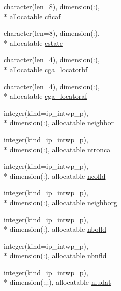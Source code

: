 \begin{DoxyCompactItemize}
\item 
character(len=8), dimension(\+:), \\*
allocatable \hyperlink{classmod__oasis__namcouple_a9b3c7c879a3ff2b5eb15cbcaf5a8a1d9}{cficaf}
\item 
character(len=8), dimension(\+:), \\*
allocatable \hyperlink{classmod__oasis__namcouple_a4b507ab44ad62713c9e3d83ded6be3f4}{cstate}
\item 
character(len=4), dimension(\+:), \\*
allocatable \hyperlink{classmod__oasis__namcouple_ac22155599e9b49d57514dd1f7dc9928a}{cga\+\_\+locatorbf}
\item 
character(len=4), dimension(\+:), \\*
allocatable \hyperlink{classmod__oasis__namcouple_a6f4080d45f0b9be5a0466967f535b83b}{cga\+\_\+locatoraf}
\item 
integer(kind=ip\+\_\+intwp\+\_\+p), \\*
dimension(\+:), allocatable \hyperlink{classmod__oasis__namcouple_a298c9165785ae1a41f89597cadd211e7}{neighbor}
\item 
integer(kind=ip\+\_\+intwp\+\_\+p), \\*
dimension(\+:), allocatable \hyperlink{classmod__oasis__namcouple_aaf9fd5eaa5d115f2548b8f78cdcd172d}{ntronca}
\item 
integer(kind=ip\+\_\+intwp\+\_\+p), \\*
dimension(\+:), allocatable \hyperlink{classmod__oasis__namcouple_a9f8a2a4f44b1c56860fef8df014339d3}{ncofld}
\item 
integer(kind=ip\+\_\+intwp\+\_\+p), \\*
dimension(\+:), allocatable \hyperlink{classmod__oasis__namcouple_a883d88938c50264711c53af2b555c3db}{neighborg}
\item 
integer(kind=ip\+\_\+intwp\+\_\+p), \\*
dimension(\+:), allocatable \hyperlink{classmod__oasis__namcouple_a21400200658d24cbf7484b5eb177c911}{nbofld}
\item 
integer(kind=ip\+\_\+intwp\+\_\+p), \\*
dimension(\+:), allocatable \hyperlink{classmod__oasis__namcouple_af0c7b1e7e49159c6b9c0dc3663264346}{nbnfld}
\item 
integer(kind=ip\+\_\+intwp\+\_\+p), \\*
dimension(\+:,\+:), allocatable \hyperlink{classmod__oasis__namcouple_abb7c2cd3a371bbb8ccd6a272d0e9b60f}{nludat}
\item 

\end{DoxyCompactItemize}
